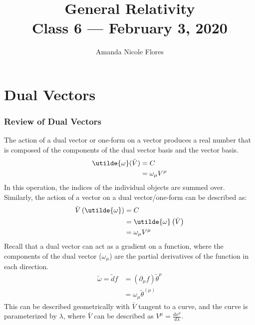 \documentclass[11pt]{article}
\title{{\Huge General Relativity}\\{\Large{Class 6 --- February 3, 2020}}} %
\author{Amanda Nicole Flores}
\begin{document}
    \maketitle
    \flushbottom
    \newpage
    \pagestyle{fancynotes}
    
    \part{Dual Vectors}
              	\section{Review of Dual Vectors}\label{sec:rev_dual_vectors}
	The action of a dual vector or one-form on a vector produces a real number that is composed of the components of the dual vector basis and the vector basis. 
              	\begin{equation}
			\begin{aligned}
			\utilde{\omega} (\bar{V}) &= C\\
			&= \omega_\mu \tensor{V}{^\mu}
    			\end{aligned} 
			\label{eq:dualvector1}
		\end{equation}
			In this operation, the indices of the individual objects are summed over. Similarly, the action of a vector on a dual vector/one-form can be described as:
			\begin{equation}
				\begin{aligned}
					\bar{V}\left(\utilde{\omega}\right) &= C\\
					&=\utilde{\omega}\left(\bar{V}\right)\\
					&= \omega_\mu \tensor{V}{^\mu}
    				\end{aligned}
				\label{eq:dualvector2}
			\end{equation}
			Recall that a dual vector can act as a gradient on a function, where the components of the dual vector ($\omega_{\mu}$) are the partial derivatives of the function in each direction.
			\begin{equation}
				\begin{aligned}
				\utilde{\omega} = \utilde{d}f &= \left(\partial_\mu f\right) \utilde{\theta}^{\mu}\\
				&= \omega_\mu \utilde{\theta}^{(\mu)}
				\end{aligned}
    			\label{eq:DV_gradient}
			\end{equation}
    		This can be described geometrically with $\bar{V}$ tangent to a curve, and the curve is parameterized by $\lambda$, where $\bar{V}$ can be described as $V^{\mu} = \frac{dx^{\mu}}{d\lambda}$.
    		
\end{document}

